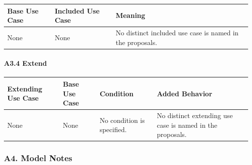 \documentclass[12pt]{article}
\renewcommand{\baselinestretch}{1.5}
\begin{document}
\begingroup
\small
\renewcommand{\baselinestretch}{1.0}\selectfont
\renewcommand{\arraystretch}{1.15}
\setlength{\tabcolsep}{6pt}
\begin{longtable}{|>{\raggedright\arraybackslash}p{}|>{\raggedright\arraybackslash}p{}|>{\raggedright\arraybackslash}p{}|}
\hline
\textbf{Base Use Case} & \textbf{Included Use Case} & \textbf{Meaning} \\ \hline
\endhead
None & None & No distinct included use case is named in the proposals. \\ \hline
\end{longtable}
\endgroup
\par\medskip

\hypertarget{sec:a3-4-extend}{}
\paragraph*{A3.4 Extend}
\par\medskip

\begingroup
\small
\renewcommand{\baselinestretch}{1.0}\selectfont
\renewcommand{\arraystretch}{1.15}
\setlength{\tabcolsep}{6pt}
\begin{longtable}{|>{\raggedright\arraybackslash}p{}|>{\raggedright\arraybackslash}p{}|>{\raggedright\arraybackslash}p{}|>{\raggedright\arraybackslash}p{}|}
\hline
\textbf{Extending Use Case} & \textbf{Base Use Case} & \textbf{Condition} & \textbf{Added Behavior} \\ \hline
\endhead
None & None & No condition is specified. & No distinct extending use case is named in the proposals. \\ \hline
\end{longtable}
\endgroup
\par\medskip

\hypertarget{sec:a4-model-notes}{}
\subsubsection*{A4. Model Notes}
\par\medskip
\end{document}
